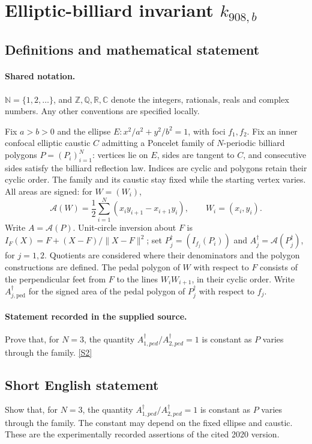 \documentclass[11pt]{article}
\newcommand{\sref}[2]{\hyperlink{source:#1:#2}{[S#2]}}
\begin{document}
\section{Elliptic-billiard invariant $k_{908,b}$}\label{statement}

\subsection{Definitions and mathematical statement}

\paragraph{Shared notation.}$\mathbb N=\{1,2,\ldots\}$, and $\mathbb Z,\mathbb Q,\mathbb R,\mathbb C$ denote the integers, rationals, reals and complex numbers. Any other conventions are specified locally.


Fix $a>b>0$ and the ellipse $E:x^2/a^2+y^2/b^2=1$, with foci $f_1,f_2$. Fix an inner confocal elliptic caustic $C$ admitting a Poncelet family of $N$-periodic billiard polygons $P=(P_i)_{i=1}^N$: vertices lie on $E$, sides are tangent to $C$, and consecutive sides satisfy the billiard reflection law. Indices are cyclic and polygons retain their cyclic order. The family and its caustic stay fixed while the starting vertex varies. All areas are signed: for $W=(W_i)$,
\[\mathcal A(W)=\frac12\sum_{i=1}^N(x_i y_{i+1}-x_{i+1}y_i),\qquad W_i=(x_i,y_i).\]
Write $A=\mathcal A(P)$. Unit-circle inversion about $F$ is $I_F(X)=F+(X-F)/\lVert X-F\rVert^2$; set $P_j^\dagger=(I_{f_j}(P_i))$ and $A_j^\dagger=\mathcal A(P_j^\dagger)$, for $j=1,2$. Quotients are considered where their denominators and the polygon constructions are defined. The pedal polygon of $W$ with respect to $F$ consists of the perpendicular feet from $F$ to the lines $W_iW_{i+1}$, in their cyclic order. Write $A_{j,\mathrm{ped}}^\dagger$ for the signed area of the pedal polygon of $P_j^\dagger$ with respect to $f_j$.
\paragraph{Statement recorded in the supplied source.}
Prove that, for $N=3$, the quantity $A_{1,ped}^\dagger/A_{2,ped}^\dagger=1$ is constant as $P$ varies through the family. \sref{statement}{2}
\subsection{Short English statement}
Show that, for $N=3$, the quantity $A_{1,ped}^\dagger/A_{2,ped}^\dagger=1$ is constant as $P$ varies through the family. The constant may depend on the fixed ellipse and caustic. These are the experimentally recorded assertions of the cited 2020 version.
\end{document}
